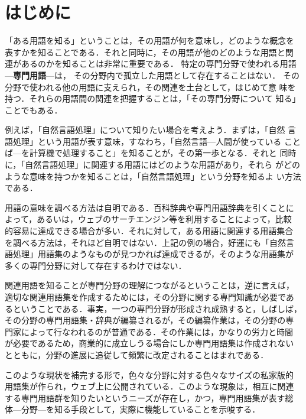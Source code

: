 \maketitle
\thispagestyle{empty}

\section{はじめに}

「ある用語を知る」ということは，その用語が何を意味し，どのような概念を
表すかを知ることである．それと同時に，その用語が他のどのような用語と関
連があるのかを知ることは非常に重要である．
特定の専門分野で使われる用語---{\bf 専門用語}---は，
その分野内で孤立した用語として存在することはない．
その分野で使われる他の用語に支えられ，その関連を土台として，はじめて意
味を持つ．それらの用語間の関連を把握することは，「その専門分野について
知る」ことでもある．

例えば，「自然言語処理」について知りたい場合を考えよう．まずは，「自然
言語処理」という用語が表す意味，すなわち，「自然言語---人間が使っている
ことば---を計算機で処理すること」を知ることが，その第一歩となる．それと
同時に，「自然言語処理」に関連する用語にはどのような用語があり，それら
がどのような意味を持つかを知ることは，「自然言語処理」という分野を知るよ
い方法である．

用語の意味を調べる方法は自明である．百科辞典や専門用語辞典を引くことに
よって，あるいは，ウェブのサーチエンジン等を利用することによって，比較
的容易に達成できる場合が多い．それに対して，ある用語に関連する用語集合
を調べる方法は，それほど自明ではない．上記の例の場合，好運にも「自然言
語処理」用語集のようなものが見つかれば達成できるが，そのような用語集が
多くの専門分野に対して存在するわけではない．

関連用語を知ることが専門分野の理解につながるということは，逆に言えば，
適切な関連用語集を作成するためには，その分野に関する専門知識が必要であ
るということである．事実，一つの専門分野が形成され成熟すると，しばしば，
その分野の専門用語集・辞典が編纂されるが，その編纂作業は，その分野の専
門家によって行なわれるのが普通である．その作業には，かなりの労力と時間
が必要であるため，商業的に成立しうる場合にしか専門用語集は作成されない
とともに，分野の進展に追従して頻繁に改定されることはまれである．

このような現状を補完する形で，色々な分野に対する色々なサイズの私家版的
用語集が作られ，ウェブ上に公開されている．このような現象は，相互に関連
する専門用語群を知りたいというニーズが存在し，かつ，専門用語集が表す総
体---分野---を知る手段として，実際に機能していることを示唆する．

